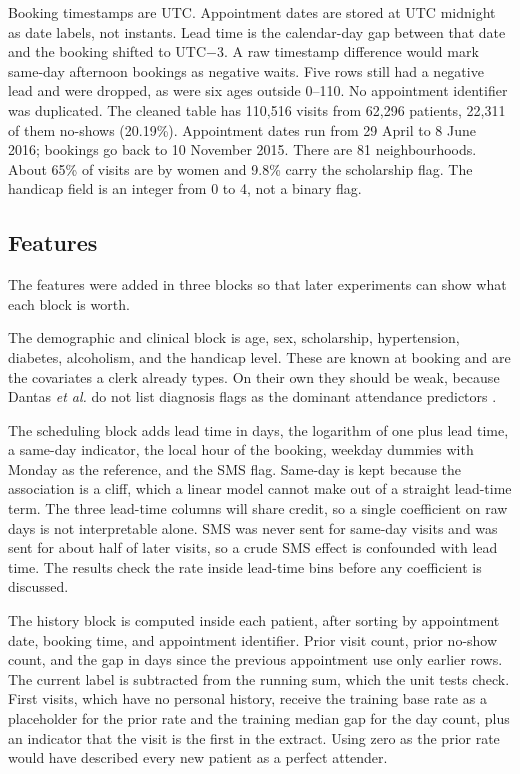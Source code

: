 \documentclass[journal]{IEEEtran}
\begin{document}
Booking timestamps are UTC. Appointment dates are stored at UTC midnight as date labels, not instants. Lead time is the calendar-day gap between that date and the booking shifted to UTC$-3$. A raw timestamp difference would mark same-day afternoon bookings as negative waits. Five rows still had a negative lead and were dropped, as were six ages outside 0--110. No appointment identifier was duplicated. The cleaned table has 110{,}516 visits from 62{,}296 patients, 22{,}311 of them no-shows (20.19\%). Appointment dates run from 29 April to 8 June 2016; bookings go back to 10 November 2015. There are 81 neighbourhoods. About 65\% of visits are by women and 9.8\% carry the scholarship flag. The handicap field is an integer from 0 to 4, not a binary flag.

\subsection{Features}
The features were added in three blocks so that later experiments can show what each block is worth.

The demographic and clinical block is age, sex, scholarship, hypertension, diabetes, alcoholism, and the handicap level. These are known at booking and are the covariates a clerk already types. On their own they should be weak, because Dantas \emph{et al.} do not list diagnosis flags as the dominant attendance predictors \cite{dantas2018}.

The scheduling block adds lead time in days, the logarithm of one plus lead time, a same-day indicator, the local hour of the booking, weekday dummies with Monday as the reference, and the SMS flag. Same-day is kept because the association is a cliff, which a linear model cannot make out of a straight lead-time term. The three lead-time columns will share credit, so a single coefficient on raw days is not interpretable alone. SMS was never sent for same-day visits and was sent for about half of later visits, so a crude SMS effect is confounded with lead time. The results check the rate inside lead-time bins before any coefficient is discussed.

The history block is computed inside each patient, after sorting by appointment date, booking time, and appointment identifier. Prior visit count, prior no-show count, and the gap in days since the previous appointment use only earlier rows. The current label is subtracted from the running sum, which the unit tests check. First visits, which have no personal history, receive the training base rate as a placeholder for the prior rate and the training median gap for the day count, plus an indicator that the visit is the first in the extract. Using zero as the prior rate would have described every new patient as a perfect attender.
\end{document}

